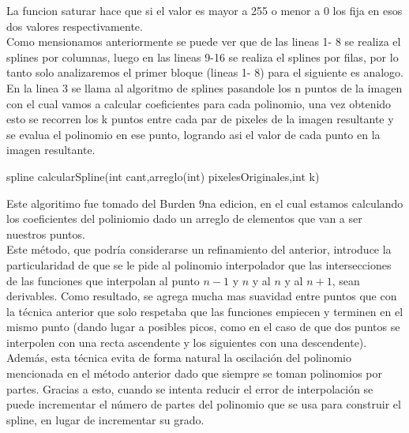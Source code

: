 La funcion saturar hace que si el valor es mayor a 255 o menor a 0 los fija en esos dos valores respectivamente.\\
Como mensionamos anteriormente se puede ver que de las lineas 1- 8 se realiza el splines por columnas, luego en las lineas 9-16 se realiza el splines por filas, por lo tanto solo analizaremos el primer bloque (lineas 1- 8) para el siguiente es analogo.\\
En la linea 3 se llama al algoritmo de splines pasandole los n puntos de la imagen con el cual vamos a calcular coeficientes para cada polinomio, una vez obtenido esto se recorren los k puntos entre cada par de pixeles de la imagen resultante y se evalua el polinomio en ese punto, logrando asi el valor de cada punto en la imagen resultante. 
\begin{algorithm}
\begin{algorithmic}[1]\parskip=1mm
\caption{spline calcularSpline(int cant,arreglo(int) pixelesOriginales,int k)}
  \STATE{\quad$ (cs_{i} + 1] - cs[i]) / (3 * k)$}
\end{algorithmic}
\end{algorithm}

Este algoritimo fue tomado del Burden 9na edicion, en el cual estamos calculando los coeficientes del poliniomio dado un arreglo de elementos que van a ser nuestros puntos.\\

Este método, que podría considerarse un refinamiento del anterior, introduce la particularidad de que se le pide al polinomio interpolador que las intersecciones de las funciones que interpolan al punto $n-1$ y $n$ y al $n$ y al $n+1$, sean derivables. Como resultado, se agrega mucha mas suavidad entre puntos que con la técnica anterior que solo respetaba que las funciones empiecen y terminen en el mismo punto (dando lugar a posibles picos, como en el caso de que dos puntos se interpolen con una recta ascendente y los siguientes con una descendente). Además, esta técnica evita de forma natural la oscilación del polinomio mencionada en el método anterior dado que siempre se toman polinomios por partes. Gracias a esto, cuando se intenta reducir el error de interpolación se puede incrementar el número de partes del polinomio que se usa para construir el spline, en lugar de incrementar su grado.
